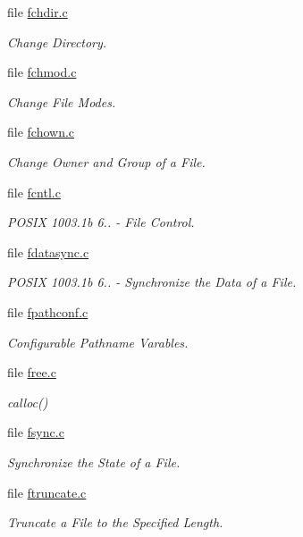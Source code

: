\begin{DoxyCompactItemize}
file \mbox{\hyperlink{fchdir_8c}{fchdir.\+c}}
\begin{DoxyCompactList}\small\item\em Change Directory. \end{DoxyCompactList}\item 
file \mbox{\hyperlink{fchmod_8c}{fchmod.\+c}}
\begin{DoxyCompactList}\small\item\em Change File Modes. \end{DoxyCompactList}\item 
file \mbox{\hyperlink{fchown_8c}{fchown.\+c}}
\begin{DoxyCompactList}\small\item\em Change Owner and Group of a File. \end{DoxyCompactList}\item 
file \mbox{\hyperlink{fcntl_8c}{fcntl.\+c}}
\begin{DoxyCompactList}\small\item\em P\+O\+S\+IX 1003.\+1b 6.. -\/ File Control. \end{DoxyCompactList}\item 
file \mbox{\hyperlink{fdatasync_8c}{fdatasync.\+c}}
\begin{DoxyCompactList}\small\item\em P\+O\+S\+IX 1003.\+1b 6.. -\/ Synchronize the Data of a File. \end{DoxyCompactList}\item 
file \mbox{\hyperlink{fpathconf_8c}{fpathconf.\+c}}
\begin{DoxyCompactList}\small\item\em Configurable Pathname Varables. \end{DoxyCompactList}\item 
file \mbox{\hyperlink{free_8c}{free.\+c}}
\begin{DoxyCompactList}\small\item\em calloc() \end{DoxyCompactList}\item 
file \mbox{\hyperlink{fsync_8c}{fsync.\+c}}
\begin{DoxyCompactList}\small\item\em Synchronize the State of a File. \end{DoxyCompactList}\item 
file \mbox{\hyperlink{ftruncate_8c}{ftruncate.\+c}}
\begin{DoxyCompactList}\small\item\em Truncate a File to the Specified Length. \end{DoxyCompactList}\item 

\end{DoxyCompactItemize}
